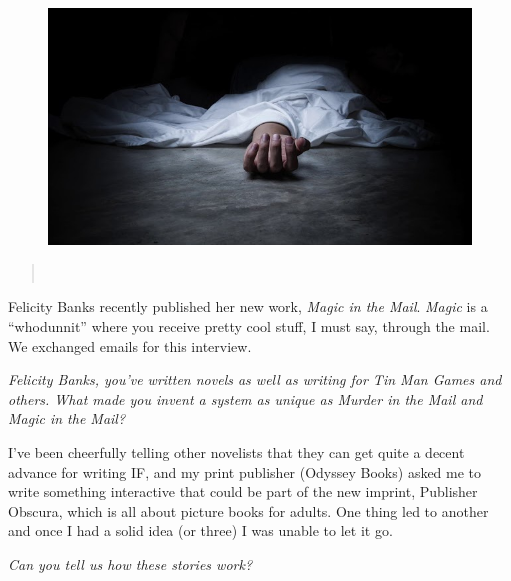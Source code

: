 \begin{figure}[h]                                                           
 \includegraphics[width=\linewidth]{./media/images/murder}%
  \label{fig:editorial}%
\end{figure}                                                                
\begin{quotation} 
\noindent{}\\[.5mm]

\hfill{}
\end{quotation} 
\newpage
Felicity Banks recently published her new work, \emph{Magic in the Mail}.
\emph{Magic} is a ``whodunnit'' where you receive pretty cool stuff, I must say,
through the mail. We exchanged emails for this interview.
\medskip

\emph{Felicity Banks, you've written novels as well as writing for Tin Man Games and others. What made you invent a system as unique as Murder in the Mail and Magic in the Mail?}
\medskip

I've been cheerfully telling other novelists that they can get quite a decent advance for writing IF, and my print publisher (Odyssey Books) asked me to write something interactive that could be part of the new imprint, Publisher Obscura, which is all about picture books for adults. One thing led to another and once I had a solid idea (or three) I was unable to let it go. 

\medskip
\emph{Can you tell us how these stories work?}

